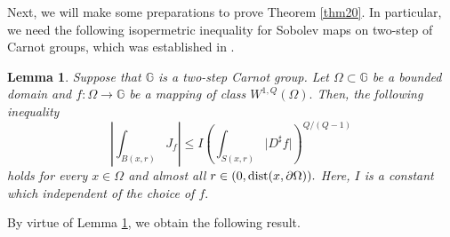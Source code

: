 \documentclass[11pt,twoside]{article}
\newtheorem{lem}[thm]{Lemma}
\theoremstyle{definition}
\theoremstyle{remark}
\newcommand{\abs}[1]{\left|#1\right|}
\begin{document}
Next, we will make some preparations to prove Theorem \ref{thm20}. In particular, we need the following isopermetric inequality for Sobolev maps on two-step of Carnot groups, which was established in \cite[Theorem 3.1]{Vod07}.
\begin{lem}{\rm\cite[Theorem 3.1]{Vod07}}\label{iso}
Suppose that $\mathbb{G}$ is a two-step Carnot group. Let $\Omega\subset \mathbb{G}$ be a bounded domain and $f:\Omega\rightarrow \mathbb{G}$ be a mapping of class $W^{1,Q}(\Omega).$ Then, the following inequality 
\begin{equation}\label{iso00000}
\abs{\int_{B(x,r)}J_{f}}\leq I\left(\int_{S(x,r)}\vert D^{\sharp}f \vert\right)^{Q/(Q-1)}
\end{equation}
holds for every $x\in\Omega$ and almost all $r\in(0,{\rm dist}(x,\partial\Omega)).$ Here, $I$ is a constant which independent of the choice of $f.$
\end{lem}


 

By virtue of Lemma \ref{iso}, we obtain the following result.
\end{document}

